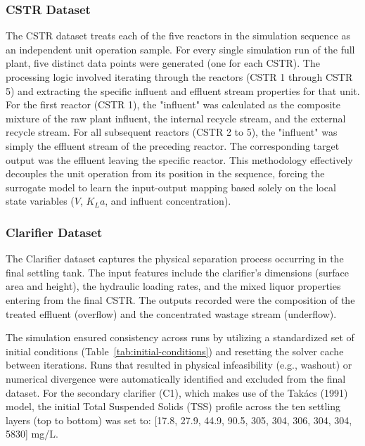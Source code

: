 \documentclass{article}
\begin{document}
\subsubsection{CSTR Dataset}
The CSTR dataset treats each of the five reactors in the simulation sequence as an independent unit operation sample. For every single simulation run of the full plant, five distinct data points were generated (one for each CSTR). The processing logic involved iterating through the reactors (CSTR 1 through CSTR 5) and extracting the specific influent and effluent stream properties for that unit. For the first reactor (CSTR 1), the "influent" was calculated as the composite mixture of the raw plant influent, the internal recycle stream, and the external recycle stream. For all subsequent reactors (CSTR 2 to 5), the "influent" was simply the effluent stream of the preceding reactor. The corresponding target output was the effluent leaving the specific reactor. This methodology effectively decouples the unit operation from its position in the sequence, forcing the surrogate model to learn the input-output mapping based solely on the local state variables ($V$, $K_{L}a$, and influent concentration).

\subsubsection{Clarifier Dataset}
The Clarifier dataset captures the physical separation process occurring in the final settling tank. The input features include the clarifier's dimensions (surface area and height), the hydraulic loading rates, and the mixed liquor properties entering from the final CSTR. The outputs recorded were the composition of the treated effluent (overflow) and the concentrated wastage stream (underflow).

The simulation ensured consistency across runs by utilizing a standardized set of initial conditions (Table~\ref{tab:initial-conditions}) and resetting the solver cache between iterations. Runs that resulted in physical infeasibility (e.g., washout) or numerical divergence were automatically identified and excluded from the final dataset. For the secondary clarifier (C1), which makes use of the Takács (1991) model, the initial Total Suspended Solids (TSS) profile across the ten settling layers (top to bottom) was set to: [17.8, 27.9, 44.9, 90.5, 305, 304, 306, 304, 304, 5830] mg/L.
\end{document}
